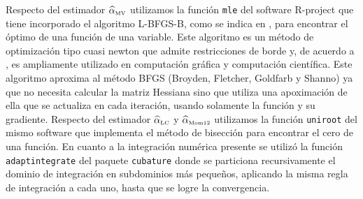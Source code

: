 Respecto del estimador $\widehat{\alpha}_{{\text{\tiny{MV}}}}$ utilizamos la función \texttt{mle} del software R-project que tiene incorporado el algoritmo L-BFGS-B, como se indica en \citet{Byrd1995}, para encontrar el óptimo de una función de una variable. Este algoritmo es un método de optimización tipo cuasi newton que admite restricciones de borde y, de acuerdo a \citet{Fei2014}, es ampliamente utilizado en computación gráfica y computación científica. Este algoritmo aproxima al método BFGS (Broyden, Fletcher, Goldfarb y Shanno) ya que no necesita calcular la matriz Hessiana sino que utiliza una apoximación de ella que se actualiza en cada iteración, usando solamente la función y su gradiente. 
Respecto del estimador $\widehat{\alpha}_{{\text{\tiny{LC}}}}$ y $\widehat{\alpha}_{{\text{\tiny{Mom12}}}}$ utilizamos la función \texttt{uniroot} del mismo software que implementa el método de bisección para encontrar el cero de una función. En cuanto a la integración numérica presente se utilizó la función \texttt{adaptintegrate} del paquete \texttt{cubature} donde se particiona recursivamente el dominio de integración
en subdominios más pequeños, aplicando la misma regla de integración a cada uno, hasta que se logre la convergencia.




